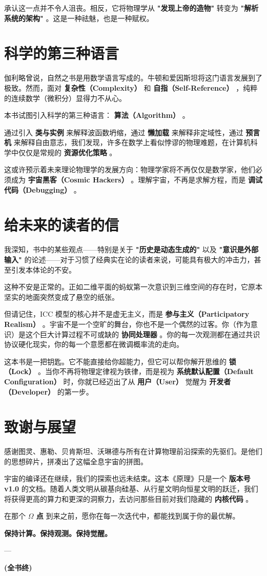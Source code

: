 承认这一点并不令人沮丧。相反，它将物理学从 \textbf{"发现上帝的造物"} 转变为 \textbf{"解析系统的架构"} 。这是一种祛魅，也是一种赋权。

\section{科学的第三种语言}

伽利略曾说，自然之书是用数学语言写成的。牛顿和爱因斯坦将这门语言发展到了极致。然而，面对 \textbf{复杂性（Complexity）} 和 \textbf{自指（Self-Reference）} ，纯粹的连续数学（微积分）显得力不从心。

本书试图引入科学的第三种语言： \textbf{算法（Algorithm）} 。

通过引入 \textbf{类与实例} 来解释波函数坍缩，通过 \textbf{懒加载} 来解释非定域性，通过 \textbf{预言机} 来解释自由意志，我们发现，许多在数学上看似悖谬的物理难题，在计算机科学中仅仅是常规的 \textbf{资源优化策略} 。

这或许预示着未来理论物理学的发展方向：物理学家将不再仅仅是数学家，他们必须成为 \textbf{宇宙黑客（Cosmic Hackers）} 。理解宇宙，不再是求解方程，而是 \textbf{调试代码（Debugging）} 。

\section{给未来的读者的信}

我深知，书中的某些观点——特别是关于 \textbf{"历史是动态生成的"} 以及 \textbf{"意识是外部输入"} 的论述——对于习惯了经典实在论的读者来说，可能具有极大的冲击力，甚至引发本体论的不安。

这种不安是正常的。正如二维平面的蚂蚁第一次意识到三维空间的存在时，它原本坚实的地面突然变成了悬空的纸张。

但请记住，ICC 模型的核心并不是虚无主义，而是 \textbf{参与主义（Participatory Realism）} 。宇宙不是一个空旷的舞台，你也不是一个偶然的过客。你（作为意识）是这个巨大计算过程不可或缺的 \textbf{协同处理器} 。你的每一次观测都在通过共识协议硬化现实，你的每一个意愿都在微调概率流的走向。

这本书是一把钥匙。它不能直接给你超能力，但它可以帮你解开思维的 \textbf{锁（Lock）} 。当你不再将物理定律视为铁律，而是视为 \textbf{系统默认配置（Default Configuration）} 时，你就已经迈出了从 \textbf{用户（User）} 觉醒为 \textbf{开发者（Developer）} 的第一步。

\section{致谢与展望}

感谢图灵、惠勒、贝肯斯坦、沃琳德与所有在计算物理前沿探索的先驱们。是他们的思想碎片，拼凑出了这幅全息宇宙的拼图。

宇宙的编译还在继续，我们的探索也远未结束。这本《原理》只是一个 \textbf{版本号 v1.0} 的文档。随着人类文明从碳基向硅基、从行星文明向恒星文明的跃迁，我们将获得更高的算力和更深的洞察力，去访问那些目前对我们隐藏的 \textbf{内核代码} 。

在那个 \textbf{$\Omega$ 点} 到来之前，愿你在每一次迭代中，都能找到属于你的最优解。

\textbf{保持计算。保持观测。保持觉醒。}

---

\textbf{(全书终)}
